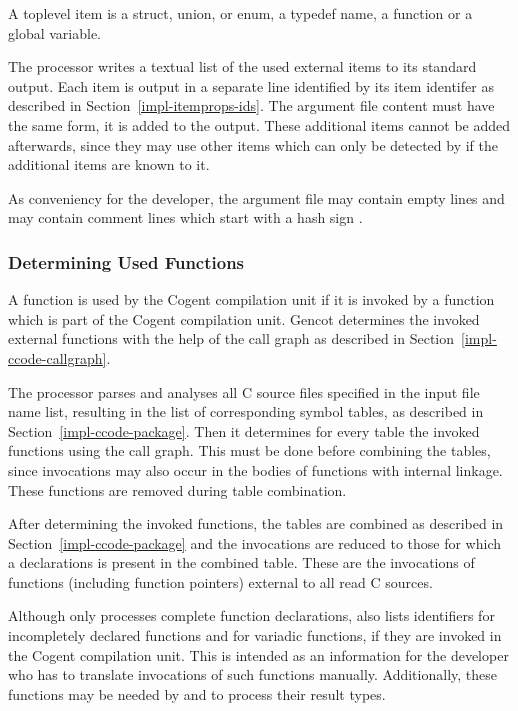 A toplevel item is a struct, union, or enum, a typedef name, a function or a global variable. 

The processor writes a textual list of the used external items to its standard output. Each item is output in a separate line 
identified by its item identifer as described in Section~\ref{impl-itemprops-ids}. The argument file content must have the 
same form, it is added to the output. These additional items cannot be added afterwards, since they may use other items
which can only be detected by  if the additional items are known to it.

As conveniency for the developer, the argument file may contain empty lines and may contain comment lines which
start with a hash sign \code{\#}.

\subsubsection{Determining Used Functions}

A function is used by the Cogent compilation unit if it is invoked by a function which is part of the Cogent compilation unit. 
Gencot determines the invoked external functions with the help of the call graph as described in 
Section~\ref{impl-ccode-callgraph}. 

The processor parses and analyses
all C source files specified in the input file name list, resulting in the list of corresponding symbol tables, as
described in Section~\ref{impl-ccode-package}. Then
it determines for every table the invoked functions using the call graph. This must
be done before combining the tables, since invocations may also occur in the bodies of functions with internal
linkage. These functions are removed during table combination.

After determining the invoked functions, the tables are combined as described in Section~\ref{impl-ccode-package}
and the invocations are reduced to those for
which a declarations is present in the combined table. These are the invocations of functions (including function pointers)
external to all read C sources. 

Although  only processes complete function declarations, 
 also lists identifiers for incompletely declared functions and for variadic functions,
if they are invoked in the Cogent compilation unit. This is intended as an 
information for the developer who has to translate invocations of such functions manually. Additionally, these functions
may be needed by  and  to process their result types.

